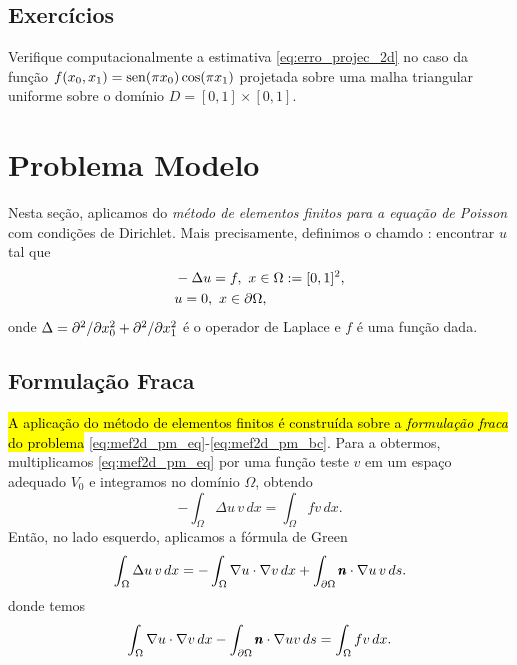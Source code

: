 \subsection{Exercícios}
\badgeRevisar

\begin{exer}
  Verifique computacionalmente a estimativa \eqref{eq:erro_projec_2d} no caso da função $f(x_0,x_1) = \operatorname{sen}(\pi x_0)\cos(\pi x_1)$ projetada sobre uma malha triangular uniforme sobre o domínio $D = [0, 1]\times [0, 1]$.
\end{exer}

\section{Problema Modelo}\label{cap_mef2d_sec_probmodelo}
\badgeRevisar

Nesta seção, aplicamos do \emph{método de elementos finitos para a equação de Poisson}{\poisson} com condições de Dirichlet{\dirichlet}. Mais precisamente, definimos o chamdo : encontrar $u$ tal que
\begin{align}\hleq
  &-\Delta u = f, ~x\in\Omega:=[0,1]^2,\label{eq:mef2d_pm_eq}\\
  &u = 0, ~x\in\p\Omega,\label{eq:mef2d_pm_bc}
\end{align}
onde $\Delta = \partial^2/\partial x_0^2 + \partial^2/\partial x_1^2$ é o operador de Laplace{\laplace} e $f$ é uma função dada.

\subsection{Formulação Fraca}
\badgeRevisar

\hl{A aplicação do método de elementos finitos é construída sobre a \emph{formulação fraca} do problema} \eqref{eq:mef2d_pm_eq}-\eqref{eq:mef2d_pm_bc}. Para a obtermos, multiplicamos \eqref{eq:mef2d_pm_eq} por uma função teste $v$ em um espaço adequado $V_0$ e integramos no domínio $\Omega$, obtendo
\begin{equation}
  - \int_\Omega \Delta u\,v\,dx = \int_\Omega fv\,dx.
\end{equation}
Então, no lado esquerdo, aplicamos a fórmula de Green{\green}
\begin{equation}
  \int_\Omega \Delta u\,v\,dx = -\int_\Omega \nabla u\cdot\nabla v\,dx + \int_{\partial\Omega} \pmb{n}\cdot\nabla u\,v\,ds.
\end{equation}
donde temos
\begin{equation}
  \int_\Omega \nabla u\cdot\nabla v\,dx - \int_{\partial\Omega} \pmb{n}\cdot\nabla uv\,ds = \int_\Omega fv\,dx.
\end{equation}

